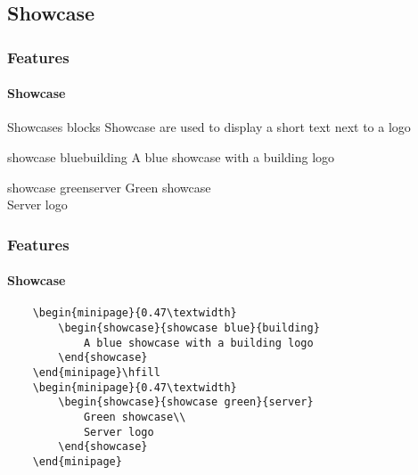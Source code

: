 \documentclass{beamer}
\begin{document}
\subsection{Showcase}

\begin{frame}[c,fragile]
    \frametitle{Features}
    \framesubtitle{Showcase}

    \begin{blueblock}{Showcases blocks}
        Showcase are used to display a short text next to a logo
    \end{blueblock}

    \vspace{1cm}

    \begin{minipage}{0.47\textwidth}
        \begin{showcase}{showcase blue}{building}
            A blue showcase with a building logo
        \end{showcase}
    \end{minipage}\hfill
    \begin{minipage}{0.47\textwidth}
        \begin{showcase}{showcase green}{server}
            Green showcase\\
            Server logo
        \end{showcase}
    \end{minipage}
\end{frame}

\begin{frame}[c,fragile]
    \frametitle{Features}
    \framesubtitle{Showcase}

    \begin{example}
        \scriptsize
        \begin{verbatim}
    \begin{minipage}{0.47\textwidth}
        \begin{showcase}{showcase blue}{building}
            A blue showcase with a building logo
        \end{showcase}
    \end{minipage}\hfill
    \begin{minipage}{0.47\textwidth}
        \begin{showcase}{showcase green}{server}
            Green showcase\\
            Server logo
        \end{showcase}
    \end{minipage}
        \end{verbatim}
    \end{example}
\end{frame}
\end{document}
